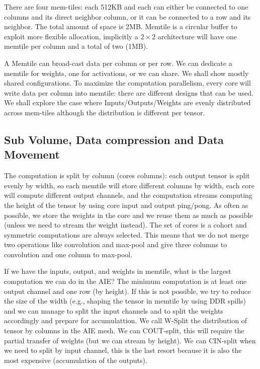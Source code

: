 \documentclass[sigconf]{acmart}
\begin{document}
There are four mem-tiles: each 512KB and each can either be connected
to one columns and its direct neighbor column, or it can be connected
to a row and its neighbor. The total amount of space is 2MB. Memtile
is a circular buffer to exploit more flexible allocation, implicitly a
$2 \times 2$ architecture will have one memtile per column and a total
of two (1MB).

A Memtile can broad-cast data per column or per row. We can dedicate a
memtile for weights, one for activations, or we can share. We shall
show mostly shared configurations. To maximize the computation
parallelism, every core will write data per column into memtile: there
are different designs that can be used. We shall explore the case
where Inputs/Outputs/Weights are evenly distributed across mem-tiles
although the distribution is different per tensor.
\begin{comment}
The DDR is connected with two channels to write into each mem-tile and
each mem-tile can use two channels to write into DDR. DDR and Mem-tile
communications are parallel.  The abstraction can be extended to more
complex connections (from $1\times 1$, $8\times 2$, to $8\times 8$ and
more rows of memtiles designed for larger chips). But $4\times 4$ is
representative for the AIE engines you will find in the next
generation of CPU+FPGA chips.
\end{comment}

\subsection{Sub Volume, Data compression and Data Movement}
The computation is split by column (cores columns): each output tensor
is split evenly by width, so each memtile will store different columns
by width, each core will compute different output channels, and the
computation streams computing the height of the tensor by using core
input and output ping/pong. As often as possible, we store the weights
in the core and we reuse them as much as possible (unless we need to
stream the weight instead). The set of cores is a cohort and symmetric
computations are always selected. This means that we do not merge two
operations like convolution and max-pool and give three columns to
convolution and one column to max-pool.

If we have the inputs, output, and weights in memtile, what is the
largest computation we can do in the AIE? The minimum computation is
at least one output channel and one row (by height). If this is not
possible, we try to reduce the size of the width (e.g., shaping the
tensor in memtile by using DDR spills) and we can manage to split the
input channels and to split the weights accordingly and prepare for
accumulattion. We call W-Split the distribution of tensor by columns
in the AIE mesh. We can COUT-split, this will require the partial
transfer of weights (but we can stream by height).  We can CIN-split
when we need to split by input channel, this is the last resort
because it is also the most expensive (accumulation of the
outputs).
\end{document}
